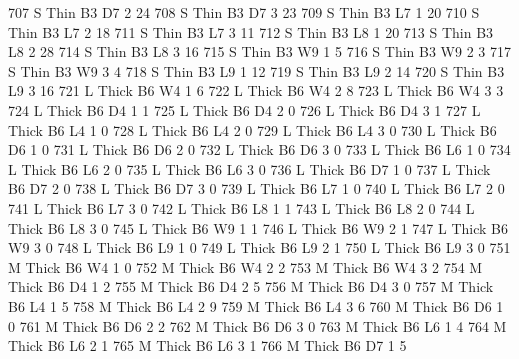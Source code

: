 \documentclass{article}
\begin{document}
\begin{Schunk}
\begin{Soutput}
707       S   Thin   B3      D7     2    24
708       S   Thin   B3      D7     3    23
709       S   Thin   B3      L7     1    20
710       S   Thin   B3      L7     2    18
711       S   Thin   B3      L7     3    11
712       S   Thin   B3      L8     1    20
713       S   Thin   B3      L8     2    28
714       S   Thin   B3      L8     3    16
715       S   Thin   B3      W9     1     5
716       S   Thin   B3      W9     2     3
717       S   Thin   B3      W9     3     4
718       S   Thin   B3      L9     1    12
719       S   Thin   B3      L9     2    14
720       S   Thin   B3      L9     3    16
721       L  Thick   B6      W4     1     6
722       L  Thick   B6      W4     2     8
723       L  Thick   B6      W4     3     3
724       L  Thick   B6      D4     1     1
725       L  Thick   B6      D4     2     0
726       L  Thick   B6      D4     3     1
727       L  Thick   B6      L4     1     0
728       L  Thick   B6      L4     2     0
729       L  Thick   B6      L4     3     0
730       L  Thick   B6      D6     1     0
731       L  Thick   B6      D6     2     0
732       L  Thick   B6      D6     3     0
733       L  Thick   B6      L6     1     0
734       L  Thick   B6      L6     2     0
735       L  Thick   B6      L6     3     0
736       L  Thick   B6      D7     1     0
737       L  Thick   B6      D7     2     0
738       L  Thick   B6      D7     3     0
739       L  Thick   B6      L7     1     0
740       L  Thick   B6      L7     2     0
741       L  Thick   B6      L7     3     0
742       L  Thick   B6      L8     1     1
743       L  Thick   B6      L8     2     0
744       L  Thick   B6      L8     3     0
745       L  Thick   B6      W9     1     1
746       L  Thick   B6      W9     2     1
747       L  Thick   B6      W9     3     0
748       L  Thick   B6      L9     1     0
749       L  Thick   B6      L9     2     1
750       L  Thick   B6      L9     3     0
751       M  Thick   B6      W4     1     0
752       M  Thick   B6      W4     2     2
753       M  Thick   B6      W4     3     2
754       M  Thick   B6      D4     1     2
755       M  Thick   B6      D4     2     5
756       M  Thick   B6      D4     3     0
757       M  Thick   B6      L4     1     5
758       M  Thick   B6      L4     2     9
759       M  Thick   B6      L4     3     6
760       M  Thick   B6      D6     1     0
761       M  Thick   B6      D6     2     2
762       M  Thick   B6      D6     3     0
763       M  Thick   B6      L6     1     4
764       M  Thick   B6      L6     2     1
765       M  Thick   B6      L6     3     1
766       M  Thick   B6      D7     1     5

\end{Soutput}
\end{Schunk}
\end{document}
